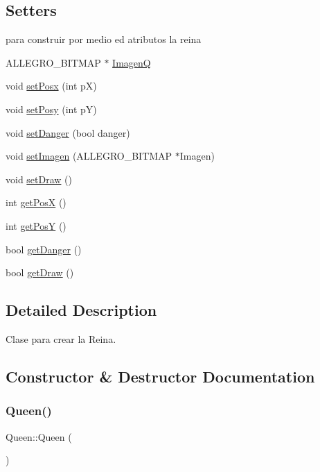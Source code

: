 \subsection*{Setters}
\label{_amgrp6e47466b75bb957a603aa54c079ac8bf}%
para construir por medio ed atributos la reina \begin{DoxyCompactItemize}
\item 
A\+L\+L\+E\+G\+R\+O\+\_\+\+B\+I\+T\+M\+AP $\ast$ \hyperlink{class_queen_a5b3e95f5f8470dd753a667c378605d3b}{ImagenQ}
\item 
void \hyperlink{class_queen_a0334b5b6895d73508d4cc995ab038b15}{set\+Posx} (int pX)
\item 
void \hyperlink{class_queen_a14154e723d5c8bd43ddfe8078af6fb28}{set\+Posy} (int pY)
\item 
void \hyperlink{class_queen_ab6b3a2e1d8ddca374d01316072386221}{set\+Danger} (bool danger)
\item 
void \hyperlink{class_queen_ad6c7f5422f81a2b84c45f8b5b274f1c8}{set\+Imagen} (A\+L\+L\+E\+G\+R\+O\+\_\+\+B\+I\+T\+M\+AP $\ast$Imagen)
\item 
void \hyperlink{class_queen_af707a14b880892d79f327ac3718d06bf}{set\+Draw} ()
\item 
int \hyperlink{class_queen_a000bf9dae46cd34eaea3608bbfab7130}{get\+PosX} ()
\item 
int \hyperlink{class_queen_a0f33ea365d6214d0ca2a34ea67a7fc80}{get\+PosY} ()
\item 
bool \hyperlink{class_queen_a8d661794a9292aa8e567bda07fe02704}{get\+Danger} ()
\item 
bool \hyperlink{class_queen_af9e50553d114a68106d189ad72c9d0a1}{get\+Draw} ()
\end{DoxyCompactItemize}


\subsection{Detailed Description}
Clase para crear la Reina. 

\subsection{Constructor \& Destructor Documentation}
\mbox{\label{class_queen_ae2314f4890c7fa7d5da670b3c0b6293b}} 
\subsubsection{\texorpdfstring{Queen()}{Queen()}}
{\footnotesize\ttfamily Queen\+::\+Queen (\begin{DoxyParamCaption}{ }\end{DoxyParamCaption})}

